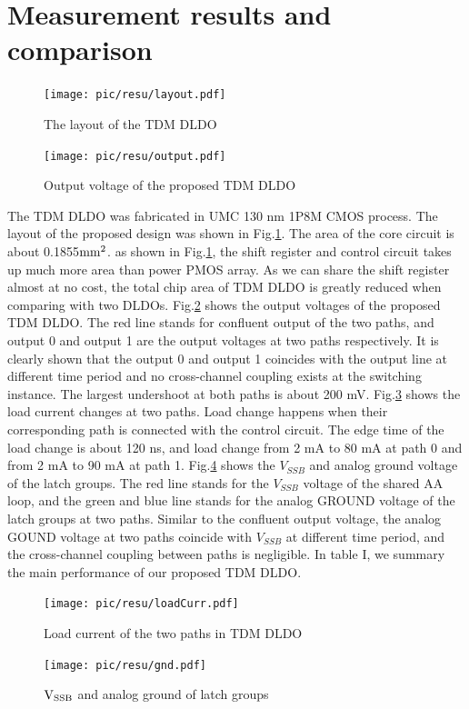 \documentclass[journal]{IEEEtran}
\begin{document}
\section{Measurement results and comparison}
\begin{figure}[t!]
    \centering
    \texttt{[image: pic/resu/layout.pdf]}
    \caption{The layout of the TDM DLDO}
    \label{fig:layout}
\end{figure}
\begin{figure}[t!]
    \centering
    \texttt{[image: pic/resu/output.pdf]}
    \caption{Output voltage of the proposed TDM DLDO}
    \label{fig:output}
\end{figure}
The TDM DLDO was fabricated in UMC 130 nm 1P8M CMOS process. The layout of the proposed design was shown in Fig.\ref{fig:layout}. The area of the core circuit is about 0.1855$\rm mm^2$. as shown in Fig.\ref{fig:layout}, the shift register and control circuit takes up much more area than power PMOS array. As we can share the shift register almost at no cost, the total chip area of TDM DLDO is greatly reduced when comparing with two DLDOs. Fig.\ref{fig:output} shows the output voltages of the proposed TDM DLDO. The red line stands for confluent output of the two paths, and output 0 and output 1 are the output voltages at two paths respectively. It is clearly shown that the output 0 and output 1 coincides with the output line at different time period and no cross-channel coupling exists at the switching instance. The largest undershoot at both paths is about 200 mV. Fig.\ref{fig:curr} shows the load current changes at two paths. Load change happens when their corresponding path is connected with the control circuit. The edge time of the load change is about 120 ns, and load change from 2 mA to 80 mA at path 0 and from 2 mA to 90 mA at path 1. Fig.\ref{fig:gnd} shows the $V_{SSB}$ and analog ground voltage of the latch groups. The red line stands for the $V_{SSB}$ voltage of the shared AA loop, and the green and blue line stands for the analog GROUND voltage of the latch groups at two paths. Similar to the confluent output voltage, the analog GOUND voltage at two paths coincide with $V_{SSB}$ at different time period, and the cross-channel coupling between paths is negligible. In table I, we summary the main performance of our proposed TDM DLDO.
\begin{figure}[t!]
    \centering
    \texttt{[image: pic/resu/loadCurr.pdf]}
    \caption{Load current of the two paths in TDM DLDO}
    \label{fig:curr}
\end{figure}
\begin{figure}[t!]
    \centering
    \texttt{[image: pic/resu/gnd.pdf]}
    \caption{$\rm V_{SSB}$ and analog ground of latch groups}
    \label{fig:gnd}
\end{figure}
\end{document}
